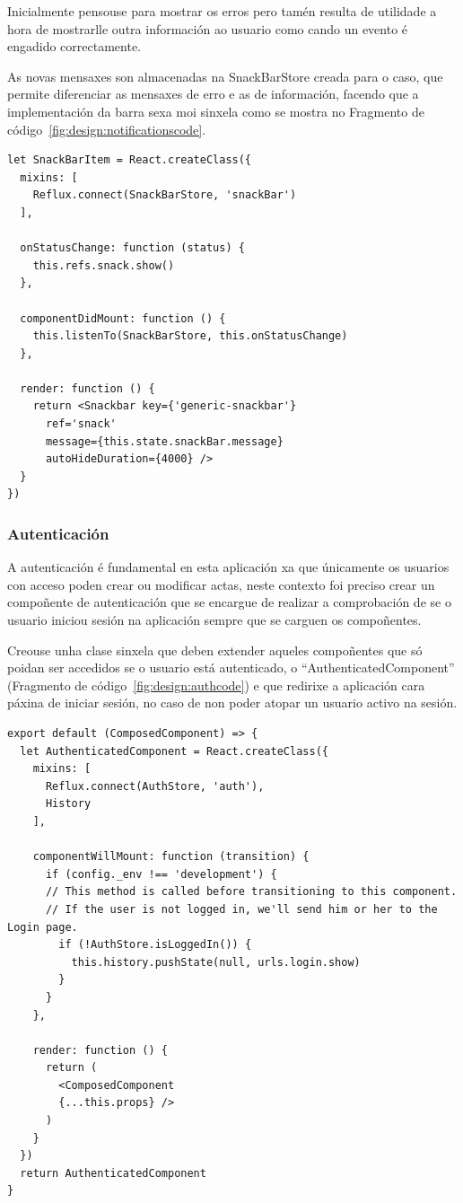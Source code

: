       Inicialmente pensouse para mostrar os erros pero tamén resulta de 
utilidade a hora de mostrarlle outra información ao usuario como cando un 
evento é engadido correctamente.

      As novas mensaxes son almacenadas na SnackBarStore creada para o caso, 
que permite diferenciar as mensaxes de erro e as de información, facendo que a 
implementación da barra sexa moi sinxela como se mostra no Fragmento de 
código~\ref{fig:design:notificationscode}.

    \lstset{}
      \begin{lstlisting}[caption=Barra de notificacións., 
label=fig:design:notificationscode]
let SnackBarItem = React.createClass({
  mixins: [
    Reflux.connect(SnackBarStore, 'snackBar')
  ],

  onStatusChange: function (status) {
    this.refs.snack.show()
  },

  componentDidMount: function () {
    this.listenTo(SnackBarStore, this.onStatusChange)
  },

  render: function () {
    return <Snackbar key={'generic-snackbar'}
      ref='snack'
      message={this.state.snackBar.message}
      autoHideDuration={4000} />
  }
})

      \end{lstlisting}

      \subsubsection{Autenticación}
      A autenticación é fundamental en esta aplicación xa que únicamente os 
usuarios con acceso poden crear ou modificar actas, neste contexto foi preciso 
crear un compoñente de autenticación que se encargue de realizar a comprobación 
de se o usuario iniciou sesión na aplicación sempre que se carguen os 
compoñentes.

      Creouse unha clase sinxela que deben extender aqueles compoñentes que só 
poidan ser accedidos se o usuario está autenticado, o 
``AuthenticatedComponent'' (Fragmento de código~\ref{fig:design:authcode}) e 
que redirixe a aplicación cara páxina de iniciar sesión, no caso de non poder 
atopar un usuario activo na sesión.

    \lstset{}
    \begin{lstlisting}[caption=Compoñente de autenticación., 
label=fig:design:authcode]
export default (ComposedComponent) => {
  let AuthenticatedComponent = React.createClass({
    mixins: [
      Reflux.connect(AuthStore, 'auth'),
      History
    ],

    componentWillMount: function (transition) {
      if (config._env !== 'development') {
      // This method is called before transitioning to this component.
      // If the user is not logged in, we'll send him or her to the Login page.
        if (!AuthStore.isLoggedIn()) {
          this.history.pushState(null, urls.login.show)
        }
      }
    },

    render: function () {
      return (
        <ComposedComponent
        {...this.props} />
      )
    }
  })
  return AuthenticatedComponent
}
    \end{lstlisting}

